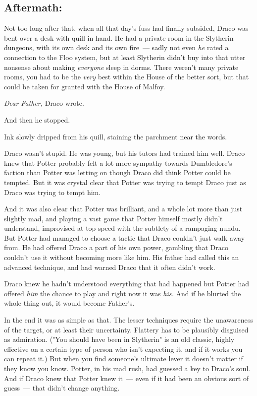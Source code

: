 \subsection{Aftermath:}

Not too long after that, when all that day's fuss had finally subsided, Draco
was bent over a desk with quill in hand. He had a private room in the Slytherin
dungeons, with its own desk and its own fire~--- sadly not even \emph{he} rated a
connection to the Floo system, but at least Slytherin didn't buy into that
utter nonsense about making \emph{everyone} sleep in dorms. There weren't many
private rooms, you had to be the \emph{very} best within the House of the
better sort, but that could be taken for granted with the House of Malfoy.

\emph{Dear Father,} Draco wrote.

And then he stopped.

Ink slowly dripped from his quill, staining the parchment near the words.

Draco wasn't stupid. He was young, but his tutors had trained him well. Draco
knew that Potter probably felt a lot more sympathy towards Dumbledore's faction
than Potter was letting on{\el} though Draco did think Potter could be
tempted. But it was crystal clear that Potter was trying to tempt Draco just as
Draco was trying to tempt him.

And it was also clear that Potter was brilliant, and a whole lot more than just
slightly mad, and playing a vast game that Potter himself mostly didn't
understand, improvised at top speed with the subtlety of a rampaging nundu. But
Potter had managed to choose a tactic that Draco couldn't just walk away from.
He had offered Draco a part of his own power, gambling that Draco couldn't use
it without becoming more like him. His father had called this an advanced
technique, and had warned Draco that it often didn't work.

Draco knew he hadn't understood everything that had happened{\el} but Potter
had offered \emph{him} the chance to play and right now it was \emph{his.} And
if he blurted the whole thing out, it would become Father's.

In the end it was as simple as that. The lesser techniques require the
unawareness of the target, or at least their uncertainty. Flattery has to be
plausibly disguised as admiration. ("You should have been in Slytherin" is an
old classic, highly effective on a certain type of person who isn't expecting
it, and if it works you can repeat it.) But when you find someone's ultimate
lever it doesn't matter if they know you know. Potter, in his mad rush, had
guessed a key to Draco's soul. And if Draco knew that Potter knew it~--- even if
it had been an obvious sort of guess~--- that didn't change anything.

